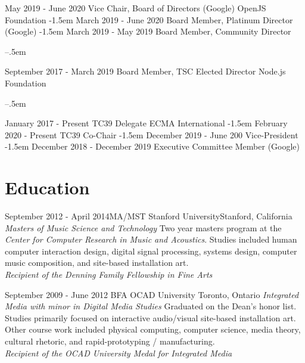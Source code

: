 \documentclass[10pt,a4paper,sans]{moderncv}   %
\begin{document}
\cventry
  {May 2019 - June 2020}
  {Vice Chair, Board of Directors (Google)}
  {OpenJS Foundation}
  {}{}{}
\kern-1.5em
\cventry
  {March 2019 - June 2020}
  {Board Member, Platinum Director (Google)}
  {}
  {}{}{}
\kern-1.5em
\cventry
  {March 2019 - May 2019}
  {Board Member, Community Director}
  {}
  {}{}{}

\kern--.5em

\cventry
  {September 2017 - March 2019}
  {Board Member, TSC Elected Director}
  {Node.js Foundation}
  {}{}{}

\kern--.5em

\cventry
  {January 2017 - Present}
  {TC39 Delegate}
  {ECMA International}
  {}{}{}
\kern-1.5em
\cventry
  {February 2020 - Present}
  {TC39 Co-Chair}
  {}
  {}{}{}
\kern-1.5em
\cventry
  {December 2019 - June 200}
  {Vice-President}
  {}
  {}{}{}
\kern-1.5em
\cventry
  {December 2018 - December 2019}
  {Executive Committee Member (Google)}
  {}
  {}{}{}


\section{Education}

\cventry
  {September 2012 - April 2014}{MA/MST}
  {Stanford University}{Stanford, California}
  {\textit{Masters of Music Science and Technology}}
  {Two year masters program at the \textit{Center for Computer Research in Music and Acoustics}.  Studies included human computer interaction design, digital signal processing, systems design, computer music composition, and site-based installation art. \\\textit{Recipient of the Denning Family Fellowship in Fine Arts }}

\cventry
  {September 2009 - June 2012}
  {BFA}
  {OCAD University}
  {Toronto, Ontario}
  {\textit{Integrated Media with minor in Digital Media Studies}}
  {Graduated on the Dean's honor list. Studies primarily focused on interactive audio/visual site-based installation art.  Other course work included physical computing, computer science, media theory, cultural rhetoric, and rapid-prototyping / manufacturing. \\\textit{Recipient of the OCAD University Medal for Integrated Media }}
\end{document}
